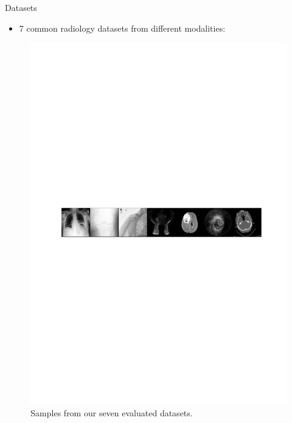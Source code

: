 \documentclass[final,hyperref={pdfpagelabels=false}]{beamer}
\begin{document}
\begin{frame}[t]
\begin{columns}[t]
\begin{column}{.47\textwidth}
\begin{block}{Datasets}
\begin{itemize}
\item 7 common radiology datasets from different modalities:
\end{itemize}
\begin{figure}
    \includegraphics[width=0.95\linewidth]{frompaper/data_eg_1row.pdf}
    \caption{\,Samples from our seven evaluated datasets.}
\end{figure}

\end{block}



\end{column}
\end{columns}
\end{frame}
\end{document}
